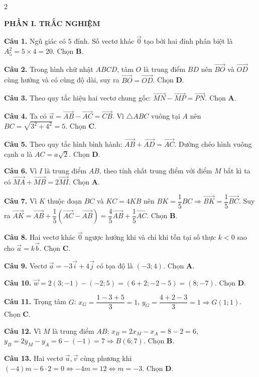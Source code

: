 \documentclass[10pt,a4paper]{article}
\begin{document}
\begin{multicols}{2}
\raggedcolumns
\small

\textbf{\color{accent}PHẦN I. TRẮC NGHIỆM}

\textbf{Câu 1.} Ngũ giác có $5$ đỉnh. Số vectơ khác $\vec{0}$ tạo bởi hai đỉnh phân biệt là $A_5^2 = 5 \times 4 = 20$. Chọn \textbf{B}.

\textbf{Câu 2.} Trong hình chữ nhật $ABCD$, tâm $O$ là trung điểm $BD$ nên $\vec{BO}$ và $\vec{OD}$ cùng hướng và có cùng độ dài, suy ra $\vec{BO} = \vec{OD}$. Chọn \textbf{D}.

\textbf{Câu 3.} Theo quy tắc hiệu hai vectơ chung gốc: $\vec{MN} - \vec{MP} = \vec{PN}$. Chọn \textbf{A}.

\textbf{Câu 4.} Ta có $\vec{u} = \vec{AB} - \vec{AC} = \vec{CB}$. Vì $\triangle ABC$ vuông tại $A$ nên $BC = \sqrt{3^2 + 4^2} = 5$. Chọn \textbf{C}.

\textbf{Câu 5.} Theo quy tắc hình bình hành: $\vec{AB} + \vec{AD} = \vec{AC}$. Đường chéo hình vuông cạnh $a$ là $AC = a\sqrt{2}$. Chọn \textbf{D}.

\textbf{Câu 6.} Vì $I$ là trung điểm $AB$, theo tính chất trung điểm với điểm $M$ bất kì ta có $\vec{MA} + \vec{MB} = 2\vec{MI}$. Chọn \textbf{A}.

\textbf{Câu 7.} Vì $K$ thuộc đoạn $BC$ và $KC = 4KB$ nên $BK = \dfrac{1}{5}BC \Rightarrow \vec{BK} = \dfrac{1}{5}\vec{BC}$. Suy ra $\vec{AK} = \vec{AB} + \dfrac{1}{5}(\vec{AC} - \vec{AB}) = \dfrac{4}{5}\vec{AB} + \dfrac{1}{5}\vec{AC}$. Chọn \textbf{B}.

\textbf{Câu 8.} Hai vectơ khác $\vec{0}$ ngược hướng khi và chỉ khi tồn tại số thực $k < 0$ sao cho $\vec{a} = k\vec{b}$. Chọn \textbf{C}.

\textbf{Câu 9.} Vectơ $\vec{a} = -3\vec{i} + 4\vec{j}$ có tọa độ là $(-3; 4)$. Chọn \textbf{A}.

\textbf{Câu 10.} $\vec{w} = 2(3; -1) - (-2; 5) = (6 + 2; -2 - 5) = (8; -7)$. Chọn \textbf{D}.

\columnbreak

\textbf{Câu 11.} Trọng tâm $G$: $x_G = \dfrac{1 - 3 + 5}{3} = 1$, $y_G = \dfrac{4 + 2 - 3}{3} = 1 \Rightarrow G(1; 1)$. Chọn \textbf{C}.

\textbf{Câu 12.} Vì $M$ là trung điểm $AB$: $x_B = 2x_M - x_A = 8 - 2 = 6$, $y_B = 2y_M - y_A = 6 - (-1) = 7 \Rightarrow B(6; 7)$. Chọn \textbf{B}.

\textbf{Câu 13.} Hai vectơ $\vec{u}, \vec{v}$ cùng phương khi $(-4)m - 6 \cdot 2 = 0 \Leftrightarrow -4m = 12 \Leftrightarrow m = -3$. Chọn \textbf{D}.


\end{multicols}
\end{document}
